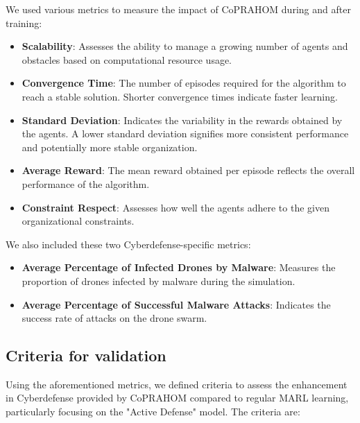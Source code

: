 \documentclass[a4paper,twoside]{article}
\begin{document}
We used various metrics to measure the impact of CoPRAHOM during and after training:
\begin{itemize}
    \item \textbf{Scalability}: Assesses the ability to manage a growing number of agents and obstacles based on computational resource usage.
    \item \textbf{Convergence Time}: The number of episodes required for the algorithm to reach a stable solution. Shorter convergence times indicate faster learning.
    \item \textbf{Standard Deviation}: Indicates the variability in the rewards obtained by the agents. A lower standard deviation signifies more consistent performance and potentially more stable organization.
    \item \textbf{Average Reward}: The mean reward obtained per episode reflects the overall performance of the algorithm.
    \item \textbf{Constraint Respect}: Assesses how well the agents adhere to the given organizational constraints. %
\end{itemize}

We also included these two Cyberdefense-specific metrics:
\begin{itemize}
    \item \textbf{Average Percentage of Infected Drones by Malware}: Measures the proportion of drones infected by malware during the simulation.
    \item \textbf{Average Percentage of Successful Malware Attacks}: Indicates the success rate of attacks on the drone swarm.
\end{itemize}

\subsection{Criteria for validation}

Using the aforementioned metrics, we defined criteria to assess the enhancement in Cyberdefense provided by CoPRAHOM compared to regular MARL learning, particularly focusing on the "Active Defense" model. The criteria are:
\end{document}
